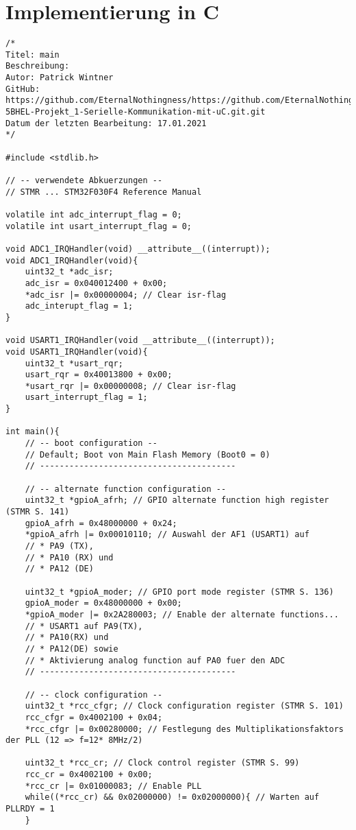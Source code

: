 \documentclass[11pt]{report}
\begin{document}
	\section{Implementierung in C}
		\begin{lstlisting}
/*
Titel: main
Beschreibung:
Autor: Patrick Wintner
GitHub: https://github.com/EternalNothingness/https://github.com/EternalNothingness/DIC-5BHEL-Projekt_1-Serielle-Kommunikation-mit-uC.git.git
Datum der letzten Bearbeitung: 17.01.2021
*/

#include <stdlib.h>

// -- verwendete Abkuerzungen --
// STMR ... STM32F030F4 Reference Manual

volatile int adc_interrupt_flag = 0;
volatile int usart_interrupt_flag = 0;

void ADC1_IRQHandler(void) __attribute__((interrupt));
void ADC1_IRQHandler(void){
	uint32_t *adc_isr;
	adc_isr = 0x040012400 + 0x00;
	*adc_isr |= 0x00000004; // Clear isr-flag
	adc_interupt_flag = 1;
}

void USART1_IRQHandler(void __attribute__((interrupt));
void USART1_IRQHandler(void){
	uint32_t *usart_rqr;
	usart_rqr = 0x40013800 + 0x00;
	*usart_rqr |= 0x00000008; // Clear isr-flag
	usart_interrupt_flag = 1;
}

int main(){
	// -- boot configuration --
	// Default; Boot von Main Flash Memory (Boot0 = 0)
	// ----------------------------------------

	// -- alternate function configuration --
	uint32_t *gpioA_afrh; // GPIO alternate function high register (STMR S. 141)
	gpioA_afrh = 0x48000000 + 0x24;
	*gpioA_afrh |= 0x00010110; // Auswahl der AF1 (USART1) auf 
	// * PA9 (TX),
	// * PA10 (RX) und
	// * PA12 (DE)

	uint32_t *gpioA_moder; // GPIO port mode register (STMR S. 136)
	gpioA_moder = 0x48000000 + 0x00;
	*gpioA_moder |= 0x2A280003; // Enable der alternate functions...
	// * USART1 auf PA9(TX),
	// * PA10(RX) und 
	// * PA12(DE) sowie
	// * Aktivierung analog function auf PA0 fuer den ADC
	// ----------------------------------------

	// -- clock configuration --
	uint32_t *rcc_cfgr; // Clock configuration register (STMR S. 101)
	rcc_cfgr = 0x4002100 + 0x04;
	*rcc_cfgr |= 0x00280000; // Festlegung des Multiplikationsfaktors der PLL (12 => f=12* 8MHz/2)

	uint32_t *rcc_cr; // Clock control register (STMR S. 99)
	rcc_cr = 0x4002100 + 0x00;
	*rcc_cr |= 0x01000083; // Enable PLL
	while((*rcc_cr) && 0x02000000) != 0x02000000){ // Warten auf PLLRDY = 1
	}


\end{lstlisting}
\end{document}

